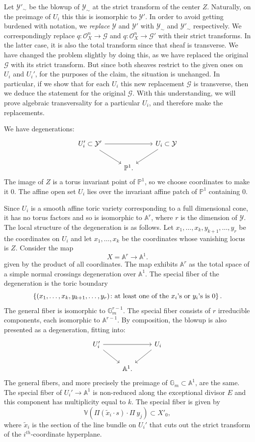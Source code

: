 \documentclass[11pt]{amsart}
\theoremstyle{definition}
\theoremstyle{definition}
\newcommand{\A}{\mathbb{A}}
\newcommand{\cG}{\mathcal{G}}
\newcommand{\cY}{\mathcal{Y}}
\newcommand{\cal}{\mathcal}
\def\cY{{\cal Y}}
\begin{document}
Let $\cY'_\sim$ be the blowup of $\cY_\sim$ at the strict transform of the center $Z$. Naturally, on the preimage of $U_i$ this this is isomorphic to $\cY'$. In order to avoid getting burdened with notation, we {\it replace} $\cY$ and $\cY'$ with $\cY_\sim$ and $\cY'_\sim$ respectively. We correspondingly replace $q\colon \mathcal{O}_X^n\rightarrow \cG$ and $q\colon \mathcal{O}_X^n \rightarrow \cG'$ with their strict transforms. In the latter case, it is also the total transform since that sheaf is transverse. We have changed the problem slightly by doing this, as we have replaced the original $\cG$ with its strict transform. But since both sheaves restrict to the given ones on $U_i$ and $U_i'$, for the purposes of the claim, the situation is unchanged. In particular, if we show that for each $U_i$ this new replacement $\cG$ is transverse, then we deduce the statement for the original $\cG$. With this understanding, we will prove algebraic transversality for a particular $U_i$, and therefore make the replacements. 

We have degenerations:
\[
\begin{tikzcd}
U_i'\subset \mathcal Y'\arrow{dr}\arrow{rr} && U_i\subset \mathcal Y\arrow{dl}\\
&\mathbb P^1.&
\end{tikzcd}
\]
The image of $Z$ is a torus invariant point of $\mathbb P^1$, so we choose coordinates to make it $0$. The affine open set $U_i$ lies over the invariant affine patch of $\mathbb P^1$ containing $0$. 

Since $U_i$ is a smooth affine toric variety corresponding to a full dimensional cone, it has no torus factors and so is isomorphic to $\mathbb A^r$, where $r$ is the dimension of $\cY$. The local structure of the degeneration is as follows. Let $x_1,\ldots,x_k,y_{k+1},\ldots,y_r$ be the coordinates on $U_i$ and let $x_1,\ldots,x_k$ be the coordinates whose vanishing locus is $Z$. Consider the map
\[
X = \mathbb A^r\to\mathbb A^1.
\]
given by the product of all coordinates. The map exhibits $\A^r$ as the total space of a simple normal crossings degeneration over $\A^1$. The special fiber of the degeneration is the toric boundary
\[
\left\{(x_1,\ldots,x_k,y_{k+1},\ldots,y_r)\colon \textnormal{at least one of the $x_i$'s or $y_i$'s is $0$} \right\}.
\]
The general fiber is isomorphic to $\mathbb G_m^{r-1}$. The special fiber consists of $r$ irreducible components, each isomorphic to $\mathbb A^{r-1}$. By composition, the blowup is also presented as a degeneration, fitting into:
\[
\begin{tikzcd}
U_i'\arrow{dr}\arrow{rr} && U_i\arrow{dl}\\
&\A^1.&
\end{tikzcd}
\]
The general fibers, and more precisely the preimage of $\mathbb G_m\subset\mathbb A^1$, are the same. The special fiber of $U_i'\to \A^1$ is non-reduced along the exceptional divisor $E$ and this component has multiplicity equal to $k$. The special fiber is given by
\[
\mathbb V(\Pi  (\widetilde x_i\cdot s)\cdot \Pi \ y_j)\subset X'_0,
\]
where $\widetilde x_i$ is the section of the line bundle on $U_i'$ that cuts out the strict transform of the $i^{th}$-coordinate hyperplane.
\end{document}

